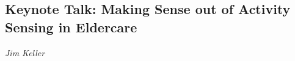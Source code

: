 \documentclass[../booklet.tex]{subfiles}
\begin{document}
\subsection[Keynote Talk: Making Sense out of Activity Sensing in Eldercare. {\it Jim Keller}]{Keynote Talk: Making Sense out of Activity Sensing in Eldercare}

\begin{center}
  {\it Jim Keller}
\end{center}

\vskip 0.8cm


 
% 
\end{document}
